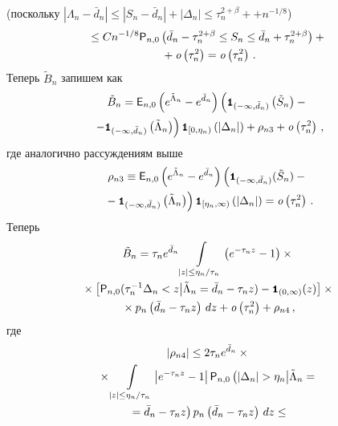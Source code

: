 \begin{multicols}{2}

\noindent
(поскольку $\left|\Lambda_n - \bar d_n\right|\leq\left|S_n-\bar d_n\right|+\left|\Delta_n\right|
\leq\tau_n^{2+\beta}+$\linebreak $+n^{-1/8}$)
\begin{multline*}
\leq C n^{-1/8}{{\sf P}}_{n,0}\left( 
\bar d_n-\tau_n^{2+\beta}\leq S_n\leq\bar d_n+\tau_n^{2+\beta} \right)+{}\\
{}+{\it o}\left(\tau_n^2\right)={\it o}\left(\tau_n^2\right)\,.
\end{multline*}
Теперь $\tilde B_n$ запишем как
\begin{multline*}
\tilde B_n={{\sf E}}_{n,0}\left(e^{\tilde \Lambda_n}-e^{\bar d_n}\right)
\left({\mbox{{\small \tt {1}}\hspace{-1.5mm}{\tt 1}}}_{(-\infty,\bar d_n)}\left(\tilde S_n\right)-{}\right.\\
{}\left. -
{\mbox{{\small \tt {1}}\hspace{-1.5mm}{\tt 1}}}_{(-\infty,\bar d_n)}\left(\tilde\Lambda_n\right)\right)
{\mbox{{\small \tt {1}}\hspace{-1.5mm}{\tt 1}}}_{[0,\eta_n)}\left(\left|\Delta_n\right|\right)
+\rho_{n3}+{\it o}\left(\tau_n^2\right)\,,
\end{multline*}
где аналогично рассуждениям выше
\begin{multline*}
\rho_{n3}\equiv {{\sf E}}_{n,0}\left(e^{\tilde \Lambda_n}-e^{\bar d_n}\right)
\left({\mbox{{\small \tt {1}}\hspace{-1.5mm}{\tt 1}}}_{(-\infty,\bar d_n)}(\tilde S_n)-{}\right.\\
\left.{}-{\mbox{{\small \tt {1}}\hspace{-1.5mm}{\tt 1}}}_{(-\infty,\bar d_n)}
\left(\tilde\Lambda_n\right)\right){\mbox{{\small \tt {1}}\hspace{-1.5mm}{\tt 1}}}_{[\eta_n,\infty)}\left(\left|\Delta_n\right|\right)
=
{\it o}\left(\tau_n^2\right)\,.
\end{multline*}
Теперь
\begin{multline*}
\tilde B_n=\tau_n e^{\bar d_n}\int\limits_{|z|\leq\eta_n/\tau_n} \left(e^{-\tau_n z}-1 \right)\times{}\\
{}\times\left[{{\sf P}}_{n,0}(\tau_n^{-1}\Delta_n < z\big| \tilde\Lambda_n=\bar d_n-\tau_n z )-{\mbox{{\small \tt {1}}\hspace{-1.5mm}{\tt 1}}}_{(0,\infty)}(z) \right]\times{}\\
{}\times
p_n\left(\bar d_n - \tau_n z\right)\,dz+{\it o}\left(\tau_n^2\right)+\rho_{n4}\,,
\end{multline*}
где
\begin{multline*}
\left|\rho_{n4}\right|\leq 2\tau_n e^{\bar d_n}\times{}\\
{}\times\int\limits_{|z|\leq\eta_n/\tau_n}\left|e^{-\tau_nz}-1\right|
{\p}_{n,0}\left(\left|\Delta_n\right|>\eta_n\big| \tilde\Lambda_n={}\right.\\
\left.{}=
\bar d_n-\tau_nz
\vphantom{\tilde{\Lambda_n}}\right)
 p_n\left(\bar d_n-\tau_nz\right)\,dz\leq{}\\

\end{multline*}
\end{multicols}
